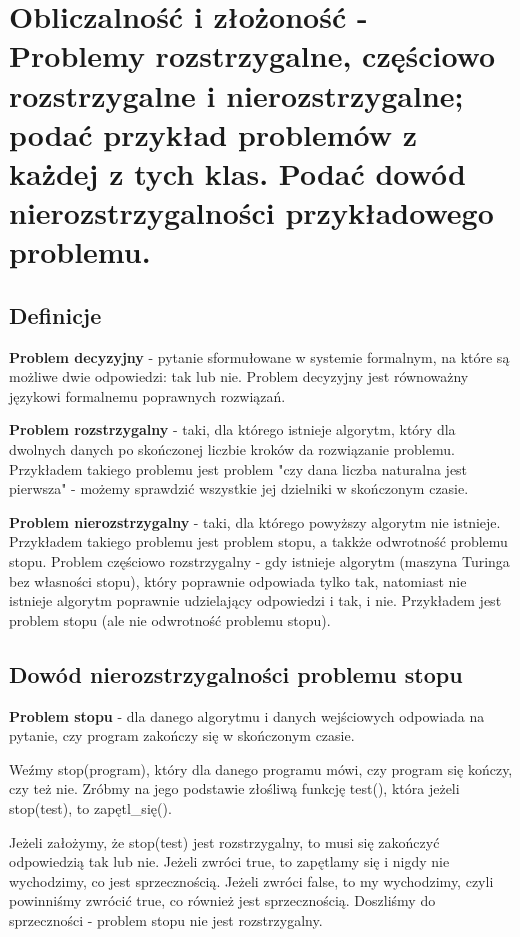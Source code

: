 \section{Obliczalność i złożoność - Problemy rozstrzygalne, częściowo rozstrzygalne i nierozstrzygalne;
podać przykład problemów z każdej z tych klas. Podać dowód nierozstrzygalności przykładowego problemu. }

\subsection{Definicje}
\textbf{Problem decyzyjny} - pytanie sformułowane w systemie formalnym, na które są możliwe dwie odpowiedzi: tak lub nie.
Problem decyzyjny jest równoważny językowi formalnemu poprawnych rozwiązań.

\textbf{Problem rozstrzygalny} - taki, dla którego istnieje algorytm,
który dla dwolnych danych po skończonej liczbie kroków da rozwiązanie problemu.
Przykładem takiego problemu jest problem "czy dana liczba naturalna jest pierwsza"
- możemy sprawdzić wszystkie jej dzielniki w skończonym czasie.

\textbf{Problem nierozstrzygalny} - taki, dla którego powyższy algorytm nie istnieje.
Przykładem takiego problemu jest problem stopu, a takkże odwrotność problemu stopu.
Problem częściowo rozstrzygalny - gdy istnieje algorytm (maszyna Turinga bez własności stopu),
który poprawnie odpowiada tylko tak, natomiast nie istnieje algorytm poprawnie udzielający odpowiedzi i tak, i nie.
Przykładem jest problem stopu (ale nie odwrotność problemu stopu).

\subsection{Dowód nierozstrzygalności problemu stopu}
\textbf{Problem stopu} - dla danego algorytmu i danych wejściowych odpowiada na pytanie,
czy program zakończy się w skończonym czasie.

Weźmy stop(program), który dla danego programu mówi, czy program się kończy, czy też nie.
Zróbmy na jego podstawie złośliwą funkcję test(), która jeżeli stop(test), to zapętl\_się().

Jeżeli założymy, że stop(test) jest rozstrzygalny, to musi się zakończyć odpowiedzią tak lub nie.
Jeżeli zwróci true, to zapętlamy się i nigdy nie wychodzimy, co jest sprzecznością.
Jeżeli zwróci false, to my wychodzimy, czyli powinniśmy zwrócić true, co również jest sprzecznością.
Doszliśmy do sprzeczności - problem stopu nie jest rozstrzygalny.
